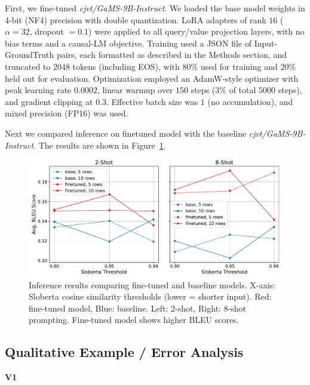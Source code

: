 \documentclass[fleqn,moreauthors,10pt]{ds_report}
\begin{document}
First, we fine-tuned \textit{cjvt/GaMS-9B-Instruct}. We loaded the base model weights in 4-bit (NF4) precision with
double quantization. LoRA adapters of rank $16$ ($\alpha = 32$, dropout $=0.1$) were applied to all query/value
projection layers, with no bias terms and a causal-LM objective.
Training used a JSON file of Input-GroundTruth pairs, each formatted as described in the Methods section, and
truncated to $2048$ tokens (including EOS), with $80\%$ used for training and $20\%$ held out for evaluation.
Optimization employed an AdamW-style optimizer with peak learning rate $0.0002$, linear warmup over $150$ steps
(3\% of total $5000$ steps), and gradient clipping at $0.3$. Effective batch size was $1$ (no accumulation), and
mixed precision (FP16) was used.

Next we compared inference on finetuned model with the baseline \textit{cjvt/GaMS-9B-Instruct}. The results are
shown in Figure~\ref{fig:inf_res}.

\begin{figure}[ht]
    \centering
    \includegraphics[width=\columnwidth]{fig/infer_res.pdf}
    \caption{Inference results comparing fine-tuned and baseline models.
    X-axis: Sloberta cosine similarity thresholds (lower = shorter input).
    Red: fine-tuned model, Blue: baseline.
    Left: 2-shot, Right: 8-shot prompting.
    Fine-tuned model shows higher BLEU scores.}
    \label{fig:inf_res}
\end{figure}

\subsection{Qualitative Example / Error Analysis}
\label{subsec:qualitative}

\vspace{1em} %
\noindent \textbf{V1}
\vspace{0.5em} %
\end{document}
